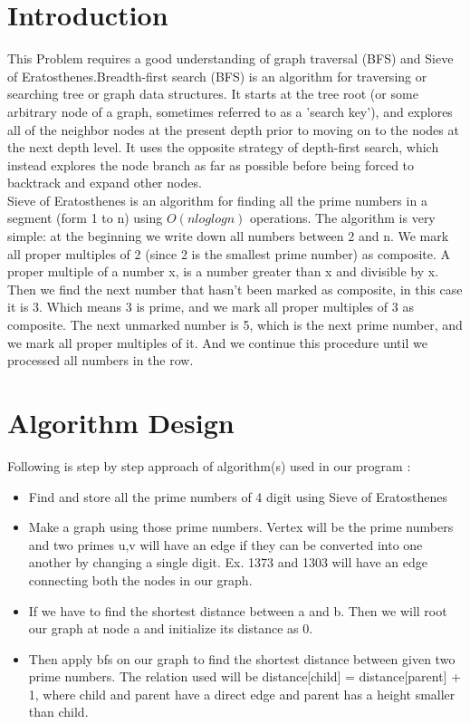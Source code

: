 \documentclass[conference]{IEEEtran}
\begin{document}
\section{Introduction}
This Problem requires a good understanding of graph traversal (BFS) and Sieve of Eratosthenes.Breadth-first search (BFS) is an algorithm for traversing or searching tree or graph data structures. It starts at the tree root (or some arbitrary node of a graph, sometimes referred to as a 'search key'), and explores all of the neighbor nodes at the present depth prior to moving on to the nodes at the next depth level.
It uses the opposite strategy of depth-first search, which instead explores the node branch as far as possible before being forced to backtrack and expand other nodes. \\
Sieve of Eratosthenes is an algorithm for finding all the prime numbers in a segment (form 1 to n) using $O(nloglogn)$ operations.
The algorithm is very simple: at the beginning we write down all numbers between 2 and n. We mark all proper multiples of 2 (since 2 is the smallest prime number) as composite. A proper multiple of a number x, is a number greater than x and divisible by x. Then we find the next number that hasn't been marked as composite, in this case it is 3. Which means 3 is prime, and we mark all proper multiples of 3 as composite. The next unmarked number is 5, which is the next prime number, and we mark all proper multiples of it. And we continue this procedure until we processed all numbers in the row.


\section{Algorithm Design}
Following is step by step approach of algorithm(s) used in our program : 
\begin{itemize}
    \item Find and store all the prime numbers of 4 digit using Sieve of Eratosthenes
    \item Make a graph using those prime numbers. Vertex will be the prime numbers and two primes u,v will have an edge if they can be converted into one another by changing a single digit. Ex. 1373 and 1303 will have an edge connecting both the nodes in our graph.
    \item If we have to find the shortest distance between a and b. Then we will root our graph at node a and initialize its distance as 0. 
    \item Then apply bfs on our graph to find the shortest distance between given two prime numbers. The relation used will be distance[child] = distance[parent] + 1, where child and parent have a direct edge and parent has a height smaller than child.
\end{itemize}
\end{document}
